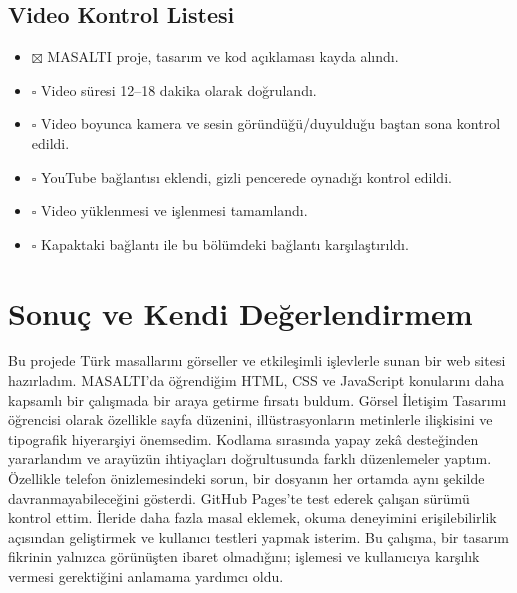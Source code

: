 \documentclass[12pt,a4paper]{article}
\begin{document}
\subsection{Video Kontrol Listesi}
\begin{itemize}[label={}]
\item $\boxtimes$ MASALTI proje, tasarım ve kod açıklaması kayda alındı.
\item $\square$ Video süresi 12--18 dakika olarak doğrulandı.
\item $\square$ Video boyunca kamera ve sesin göründüğü/duyulduğu baştan sona kontrol edildi.
\item $\square$ YouTube bağlantısı eklendi, gizli pencerede oynadığı kontrol edildi.
\item $\square$ Video yüklenmesi ve işlenmesi tamamlandı.
\item $\square$ Kapaktaki bağlantı ile bu bölümdeki bağlantı karşılaştırıldı.
\end{itemize}

\section{Sonuç ve Kendi Değerlendirmem}
Bu projede Türk masallarını görseller ve etkileşimli işlevlerle sunan bir web sitesi hazırladım. MASALTI'da öğrendiğim HTML, CSS ve JavaScript konularını daha kapsamlı bir çalışmada bir araya getirme fırsatı buldum. Görsel İletişim Tasarımı öğrencisi olarak özellikle sayfa düzenini, illüstrasyonların metinlerle ilişkisini ve tipografik hiyerarşiyi önemsedim. Kodlama sırasında yapay zekâ desteğinden yararlandım ve arayüzün ihtiyaçları doğrultusunda farklı düzenlemeler yaptım. Özellikle telefon önizlemesindeki sorun, bir dosyanın her ortamda aynı şekilde davranmayabileceğini gösterdi. GitHub Pages'te test ederek çalışan sürümü kontrol ettim. İleride daha fazla masal eklemek, okuma deneyimini erişilebilirlik açısından geliştirmek ve kullanıcı testleri yapmak isterim. Bu çalışma, bir tasarım fikrinin yalnızca görünüşten ibaret olmadığını; işlemesi ve kullanıcıya karşılık vermesi gerektiğini anlamama yardımcı oldu.
\end{document}

